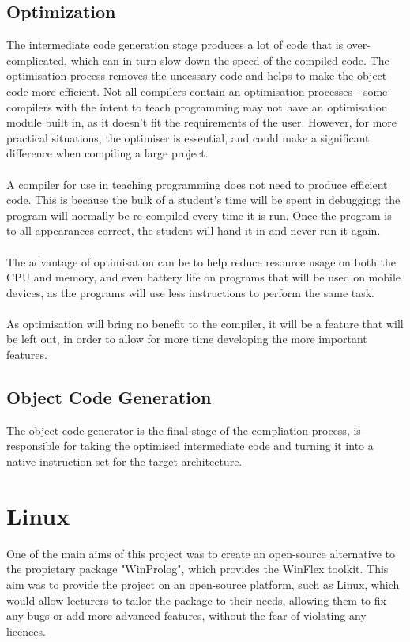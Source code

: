 \documentclass[12pt]{report}
\begin{document}
\subsection{Optimization}\label{subsec:optimization}
The intermediate code generation stage produces a lot of code that is over-complicated, which can in turn slow down the speed of the compiled code.  The optimisation process removes the uncessary code and helps to make the object code more efficient.  Not all compilers contain an optimisation processes - some compilers with the intent to teach programming may not have an optimisation module built in, as it doesn't fit the requirements of the user.  However, for more practical situations, the optimiser is essential, and could make a significant difference when compiling a large project.\\
\\
A compiler for use in teaching programming does not need to produce efficient code.  This is because the bulk of a student's time will be spent in debugging; the program will normally be re-compiled every time it is run.  Once the program is to all appearances correct, the student will hand it in and never run it again. \citep{compilerconstruction92}\\
\\
The advantage of optimisation can be to help reduce resource usage on both the CPU and memory, and even battery life on programs that will be used on mobile devices, as the programs will use less instructions to perform the same task.\\
\\
As optimisation will bring no benefit to the compiler, it will be a feature that will be left out, in order to allow for more time developing the more important features.
\subsection{Object Code Generation}\label{subsec:object_code_gen}
The object code generator is the final stage of the compliation process, is responsible for taking the optimised intermediate code and turning it into a native instruction set for the target architecture.


\section{Linux}\label{sec:linux}
One of the main aims of this project was to create an open-source alternative to the propietary package "WinProlog", which provides the WinFlex toolkit.  This aim was to provide the project on an open-source platform, such as Linux, which would allow lecturers to tailor the package to their needs, allowing them to fix any bugs or add more advanced features, without the fear of violating any licences.
\end{document}
